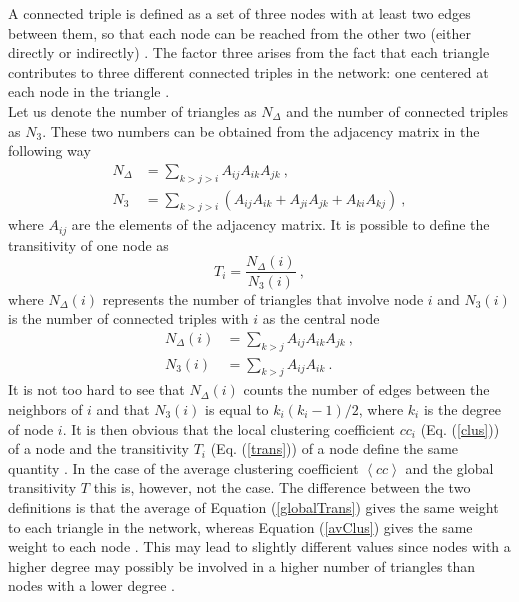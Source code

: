 \documentclass[11 pt , letterpaper , twoside , openright]{book}
\begin{document}
\newline
A connected triple is defined as a set of three nodes with at least two edges between them, so that each node can be reached from the other two (either directly or indirectly) \cite{Newman2003}. The factor three arises from the fact that each triangle contributes to three different connected triples in the network: one centered at each node in the triangle \cite{F.Costa2007}. \\
\newpage
\noindent
Let us denote the number of triangles as $N_{\Delta}$ and the number of connected triples as $N_3$. These two numbers can be obtained from the adjacency matrix in the following way \cite{F.Costa2007}
\begin{align}
	N_{\Delta} &= \sum_{k > j > i} A_{ij}A_{ik}A_{jk} \ , \\
	N_3 &= \sum_{k > j > i} (A_{ij}A_{ik} + A_{ji}A_{jk} + A_{ki}A_{kj}) \ ,
\end{align}
where $A_{ij}$ are the elements of the adjacency matrix. It is possible to define the transitivity of one node as \cite{F.Costa2007}
\begin{equation}\label{trans}
	T_i = \frac{N_{\Delta}(i)}{N_3(i)} \ ,
\end{equation}
where $N_{\Delta}(i)$ represents the number of triangles that involve node $i$ and $N_3(i)$ is the number of connected triples with $i$ as the central node \cite{F.Costa2007}
\begin{align}
	N_{\Delta}(i) &= \sum_{k > j} A_{ij}A_{ik}A_{jk} \ , \\
	N_3(i) &= \sum_{k > j} A_{ij}A_{ik} \ .
\end{align}
It is not too hard to see that $N_{\Delta}(i)$ counts the number of edges between the neighbors of $i$ and that $N_3(i)$ is equal to $k_i(k_i-1)/2$, where $k_i$ is the degree of node $i$. It is then obvious that the local clustering coefficient $cc_i$ (Eq. (\ref{clus})) of a node and the transitivity $T_i$ (Eq. (\ref{trans})) of a node define the same quantity \cite{F.Costa2007}. In the case of the average clustering coefficient $\left<cc\right>$ and the global transitivity $T$ this is, however, not the case. The difference between the two definitions is that the average of Equation (\ref{globalTrans}) gives the same weight to each triangle in the network, whereas Equation (\ref{avClus}) gives the same weight to each node \cite{Newman2003}. This may lead to slightly different values since nodes with a higher degree may possibly be involved in a higher number of triangles than nodes with a lower degree \cite{F.Costa2007}.
	
\end{document}
